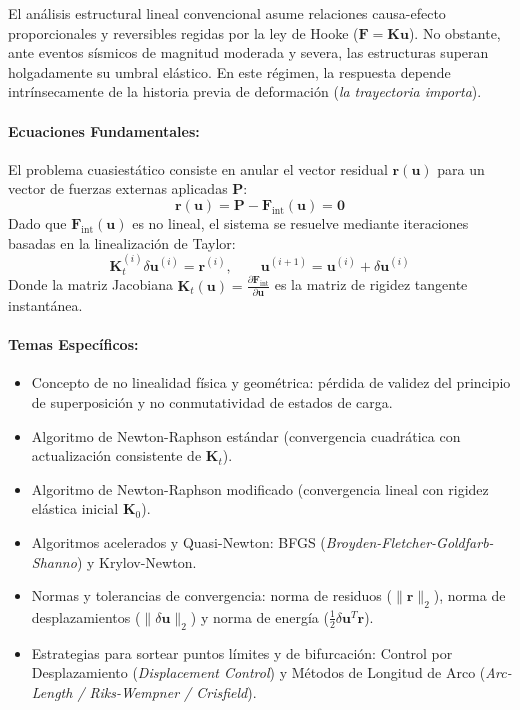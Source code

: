\documentclass[11pt,letterpaper]{article}
\begin{document}
\begin{modulebox}
El análisis estructural lineal convencional asume relaciones causa-efecto proporcionales y reversibles regidas por la ley de Hooke ($\mathbf{F} = \mathbf{K}\mathbf{u}$). No obstante, ante eventos sísmicos de magnitud moderada y severa, las estructuras superan holgadamente su umbral elástico. En este régimen, la respuesta depende intrínsecamente de la historia previa de deformación (\textit{la trayectoria importa}).

\paragraph{Ecuaciones Fundamentales:}
El problema cuasiestático consiste en anular el vector residual $\mathbf{r}(\mathbf{u})$ para un vector de fuerzas externas aplicadas $\mathbf{P}$:
\begin{equation}
    \mathbf{r}(\mathbf{u}) = \mathbf{P} - \mathbf{F}_{\text{int}}(\mathbf{u}) = \mathbf{0}
\end{equation}
Dado que $\mathbf{F}_{\text{int}}(\mathbf{u})$ es no lineal, el sistema se resuelve mediante iteraciones basadas en la linealización de Taylor:
\begin{equation}
    \mathbf{K}_t^{(i)} \delta \mathbf{u}^{(i)} = \mathbf{r}^{(i)}, \qquad \mathbf{u}^{(i+1)} = \mathbf{u}^{(i)} + \delta \mathbf{u}^{(i)}
\end{equation}
Donde la matriz Jacobiana $\mathbf{K}_t(\mathbf{u}) = \frac{\partial \mathbf{F}_{\text{int}}}{\partial \mathbf{u}}$ es la matriz de rigidez tangente instantánea.

\paragraph{Temas Específicos:}
\begin{itemize}
    \item Concepto de no linealidad física y geométrica: pérdida de validez del principio de superposición y no conmutatividad de estados de carga.
    \item Algoritmo de Newton-Raphson estándar (convergencia cuadrática con actualización consistente de $\mathbf{K}_t$).
    \item Algoritmo de Newton-Raphson modificado (convergencia lineal con rigidez elástica inicial $\mathbf{K}_0$).
    \item Algoritmos acelerados y Quasi-Newton: BFGS (\textit{Broyden-Fletcher-Goldfarb-Shanno}) y Krylov-Newton.
    \item Normas y tolerancias de convergencia: norma de residuos ($\|\mathbf{r}\|_2$), norma de desplazamientos ($\|\delta\mathbf{u}\|_2$) y norma de energía ($\frac{1}{2}\delta\mathbf{u}^T\mathbf{r}$).
    \item Estrategias para sortear puntos límites y de bifurcación: Control por Desplazamiento (\textit{Displacement Control}) y Métodos de Longitud de Arco (\textit{Arc-Length / Riks-Wempner / Crisfield}).
\end{itemize}
\end{modulebox}
\end{document}
